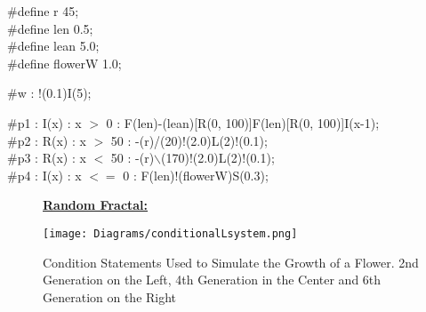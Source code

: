 \begin{flushleft}
\vspace{5mm}

\#define r 45; \\
\#define len 0.5; \\
\#define lean 5.0; \\
\#define flowerW 1.0; \\

\vspace{5mm}

\#w : !(0.1)I(5); \\

\vspace{5mm}

\#p1 : I(x) : x $>$ 0 : F(len)-(lean)[R({0, 100})]F(len)[R({0, 100})]I(x-1);\\
\#p2 : R(x) : x $>$ 50 : -(r)/(20)!(2.0)L(2)!(0.1); \\
\#p3 : R(x) : x $<$ 50 : -(r)$\backslash$(170)!(2.0)L(2)!(0.1); \\
\#p4 : I(x) : x $<=$ 0 : F(len)!(flowerW)S(0.3); \\

\vspace{5mm}



\end{flushleft}

\begin{figure}[htbp]
\raggedright
\textbf{\underline{Random Fractal:}} \\
	{\centering
		\vspace{7px}
		\texttt{[image: Diagrams/conditionalLsystem.png]}
		\caption{Condition Statements Used to Simulate the Growth of a Flower. 2nd Generation on the Left, 4th Generation in the Center and 6th Generation on the Right}
	}
\end{figure}

\FloatBarrier








